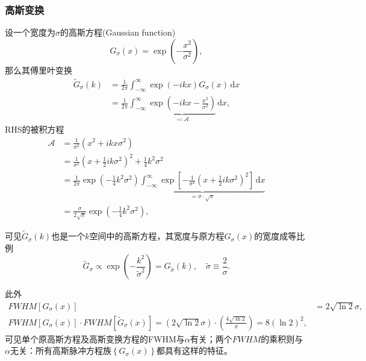 \subsubsection{高斯变换}
\label{sec:fourier-gaussian}
设一个宽度为$\sigma$的高斯方程(Gaussian function)
\begin{equation*}
  G_{\sigma}(x) = \exp \left( - \frac{x^{2}}{\sigma^{2}}\right),
\end{equation*}
那么其傅里叶变换
\begin{equation*}
  \begin{split}
    \widetilde{G}_{\sigma} \left( k \right)
    & = \frac{1}{2 \pi}
    \int_{-\infty}^{\infty} \exp \left( - i k x \right)
    G_{\sigma} \left( x \right) \, \mathrm{d} x \\
    & = \frac{1}{2 \pi}
    \int_{-\infty}^{\infty}
    \underbrace{
    \exp
    \left(
    - i k x - \frac{x^{2}}{\sigma^{2}}
    \right)
    }_{\eqqcolon \mathcal{A} }
    \, \mathrm{d} x,
  \end{split}
\end{equation*}
RHS的被积方程
\begin{equation*}
  \begin{split}
    \mathcal{A} & = \frac{1}{\sigma^{2}}
    \left( x^{2} + i k x \sigma^{2} \right) \\
    & = \frac{1}{\sigma^{2}}
    \left(
    x + \frac{1}{2} i k \sigma^{2}
    \right)^{2} + \frac{1}{4} k^{2} \sigma^{2} \\
    & = \frac{1}{2 \pi} \exp \left( - \frac{1}{4} k^{2} \sigma^{2} \right)
    \underbrace{
    \int_{-\infty}^{\infty} \exp
    \left[
    - \frac{1}{\sigma^{2}}
    \left( x + \frac{1}{2} i k \sigma^{2} \right)^{2}
    \right] \, \mathrm{d} x
    }_{= \sigma \cdot \sqrt{\pi}} \\
    & = \frac{\sigma}{2 \sqrt{\pi}} \exp \left( - \frac{1} {4} k^{2} \sigma^{2} \right),
  \end{split}
\end{equation*}

可见$\widetilde{G}_{\sigma}(k)$也是一个$k$空间中的高斯方程，其宽度与原方程$G_{\sigma}(x)$的宽度成等比例
\begin{equation*}
  \widetilde{G}_{\sigma} \propto \exp \left( - \frac{k^{2}}{\tilde{\sigma}^{2}} \right) = G_{\tilde{\sigma}} \left( k \right), \quad \tilde{\sigma} \equiv \frac{2}{\sigma}.
\end{equation*}

此外
\begin{equation}
    \label{eq:fourier-gaussian-fwhm-product}
  \begin{split}
    FWHM \left[ G_{\sigma} \left( x \right) \right]
    & = 2 \sqrt{ \ln 2} \sigma, \\
    FWHM \left[ G_{\sigma} \left( x \right) \right] \cdot FWHM \left[ \widetilde{G}_{\sigma} \left( x \right) \right]
    = \left( 2 \sqrt{\ln 2} \sigma \right) \cdot
    \left( \frac{4 \sqrt{\ln 2}}{\sigma}\right) = 8 \left( \ln 2\right)^{2},
  \end{split}
\end{equation}
可见单个原高斯方程及高斯变换方程的FWHM与$\alpha$有关；两个$FWHM$的乘积则与$\alpha$无关：所有高斯脉冲方程族$\left\{ G_{\sigma}(x) \right\}$都具有这样的特征。

